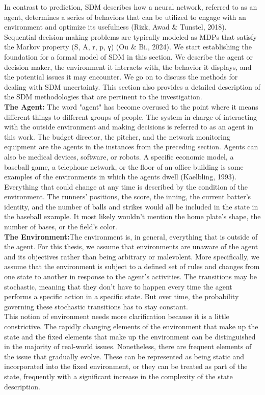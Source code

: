 \documentclass[a4paper,11pt,onecolumn]{article}
\begin{document}
In contrast to prediction, SDM describes how a neural network, referred to as an agent, determines a series of behaviors that can be utilized to engage with an environment and optimize its usefulness (Rizk, Awad & Tunstel, 2018). Sequential decision-making problems are typically modeled as MDPs that satisfy the Markov property (S, A, r, p, γ) (Ou & Bi., 2024). We start establishing the foundation for a formal model of SDM in this section. We describe the agent or decision maker, the environment it interacts with, the behavior it displays, and the potential issues it may encounter. We go on to discuss the methods for dealing with SDM uncertainty. This section also provides a detailed description of the SDM methodologies that are pertinent to the investigation.\\
\textbf{The Agent:} The word "agent" has become overused to the point where it means different things to different groups of people. The system in charge of interacting with the outside environment and making decisions is referred to as an agent in this work. The budget director, the pitcher, and the network monitoring equipment are the agents in the instances from the preceding section. Agents can also be medical devices, software, or robots. A specific economic model, a baseball game, a telephone network, or the floor of an office building is some examples of the environments in which the agents dwell (Kaelbling, 1993). Everything that could change at any time is described by the condition of the environment. The runners' positions, the score, the inning, the current batter's identity, and the number of balls and strikes would all be included in the state in the baseball example. It most likely wouldn't mention the home plate's shape, the number of bases, or the field's color.\\
\textbf{The Environment:}The environment is, in general, everything that is outside of the agent. For this thesis, we assume that environments are unaware of the agent and its objectives rather than being arbitrary or malevolent. More specifically, we assume that the environment is subject to a defined set of rules and changes from one state to another in response to the agent's activities. The transitions may be stochastic, meaning that they don't have to happen every time the agent performs a specific action in a specific state. But over time, the probability governing these stochastic transitions has to stay constant.\\
This notion of environment needs more clarification because it is a little constrictive. The rapidly changing elements of the environment that make up the state and the fixed elements that make up the environment can be distinguished in the majority of real-world issues. Nonetheless, there are frequent elements of the issue that gradually evolve. These can be represented as being static and incorporated into the fixed environment, or they can be treated as part of the state, frequently with a significant increase in the complexity of the state description. \\
\end{document}
